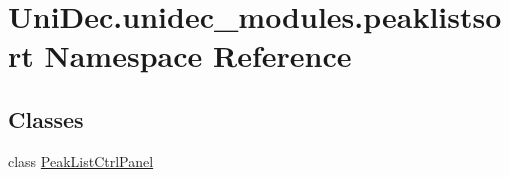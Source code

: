 \hypertarget{namespace_uni_dec_1_1unidec__modules_1_1peaklistsort}{}\section{Uni\+Dec.\+unidec\+\_\+modules.\+peaklistsort Namespace Reference}
\label{namespace_uni_dec_1_1unidec__modules_1_1peaklistsort}
\subsection*{Classes}
\begin{DoxyCompactItemize}
\item 
class \hyperlink{class_uni_dec_1_1unidec__modules_1_1peaklistsort_1_1_peak_list_ctrl_panel}{Peak\+List\+Ctrl\+Panel}
\end{DoxyCompactItemize}
